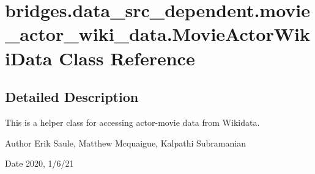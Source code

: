 \hypertarget{classbridges_1_1data__src__dependent_1_1movie__actor__wiki__data_1_1_movie_actor_wiki_data}{}\section{bridges.\+data\+\_\+src\+\_\+dependent.\+movie\+\_\+actor\+\_\+wiki\+\_\+data.\+Movie\+Actor\+Wiki\+Data Class Reference}
\label{classbridges_1_1data__src__dependent_1_1movie__actor__wiki__data_1_1_movie_actor_wiki_data}


\subsection{Detailed Description}
This is a helper class for accessing actor-\/movie data from Wikidata. 

\begin{DoxyAuthor}{Author}
Erik Saule, Matthew Mcquaigue, Kalpathi Subramanian 
\end{DoxyAuthor}
\begin{DoxyDate}{Date}
2020, 1/6/21 
\end{DoxyDate}
